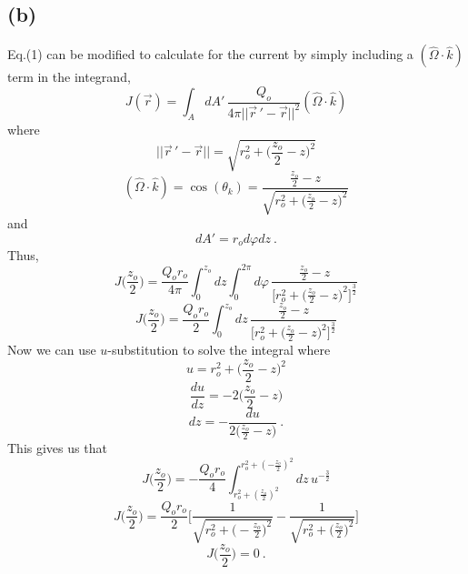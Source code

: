 \documentclass{article}
\begin{document}
\pagebreak

\subsection*{(b)}

Eq.(1) can be modified to calculate for the current by simply including a $(\hat{\Omega} \cdot \hat{k})$ term in the integrand, 
\begin{equation*}
J(\vec{r}) = \int_A dA' \, \frac{Q_o}{4 \pi ||\vec{r}\,'-\vec{r}||^2} (\hat{\Omega} \cdot \hat{k})
\end{equation*}
where 
\begin{equation*}
||\vec{r}\,'-\vec{r}|| =  \sqrt{ r_o^2 + \big(\frac{z_o}{2}-z\big)^2 } 
\end{equation*}
\begin{equation*}
(\hat{\Omega} \cdot \hat{k}) = \cos(\theta_k) = \frac{\frac{z_o}{2} - z}{\sqrt{ r_o^2 + \big(\frac{z_o}{2} - z\big)^2 } }
\end{equation*}
and
\begin{equation*}
dA' = r_o d\varphi dz \: .
\end{equation*}
Thus,
\begin{equation*}
J\Big(\frac{z_o}{2}\Big) = \frac{Q_o r_o}{4\pi} \int_0^{z_o} dz \int_0^{2\pi} d\varphi \, \frac{\frac{z_o}{2} - z}{\Big[ r_o^2 + \big(\frac{z_o}{2} - z\big)^2 \Big]^{\frac{3}{2}}} 
\end{equation*}
\begin{equation*}
J\Big(\frac{z_o}{2}\Big) = \frac{Q_o r_o}{2} \int_0^{z_o} dz \, \frac{\frac{z_o}{2} - z}{\Big[ r_o^2 + \big(\frac{z_o}{2} - z\big)^2 \Big]^{\frac{3}{2}}} 
\end{equation*}
Now we can use $u$-substitution to solve the integral where
\begin{equation*}
u = r_o^2 + \big(\frac{z_o}{2}-z \big)^2
\end{equation*}
\begin{equation*}
\frac{du}{dz} = -2 \big(\frac{z_o}{2}-z \big)
\end{equation*}
\begin{equation*}
dz = - \frac{du}{2 \big(\frac{z_o}{2}-z \big)} \: .
\end{equation*}
This gives us that
\begin{equation*}
J\Big(\frac{z_o}{2}\Big) = - \frac{Q_o r_o}{4} \int_{r_o^2+(\frac{z_o}{2})^2}^{r_o^2+(-\frac{z_o}{2})^2} dz \, u^{-\frac{3}{2}} 
\end{equation*}
\begin{equation*}
J\Big(\frac{z_o}{2}\Big) =\frac{Q_o r_o}{2} \Bigg[ \frac{1}{\sqrt{r_o^2+\big(-\frac{z_o}{2}\big)^2}} - \frac{1}{\sqrt{r_o^2+\big(\frac{z_o}{2}\big)^2}} \Bigg] 
\end{equation*}
\begin{equation*}
\boxed{ J\Big(\frac{z_o}{2}\Big) = 0 } \: .
\end{equation*}
\end{document}
